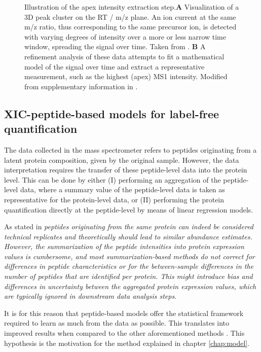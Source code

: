 \documentclass[11pt, a4paper]{report}
\begin{document}
\begin{figure}[!h]
\begin{subfigure}{1\textwidth}
\end{subfigure}
\caption{Illustration of the apex intensity extraction step.\textbf{A} Visualization of a 3D peak cluster on the RT / m/z plane. An ion current at the same m/z ratio, thus corresponding to the same precursor ion, is detected with varying degrees of intensity over a more or less narrow time window, spreading the signal over time. Taken from \cite{Smith2014}. \textbf{B} A refinement analysis of these data attempts to fit a mathematical model of the signal over time and extract a representative measurement, such as the highest (apex) \ac{MS1} intensity. Modified from supplementary information in \cite{Argentini2016}.}
\label{figure:moff_apex}
\end{figure}


\subsection{\ac{XIC}-peptide-based models for label-free quantification}
\label{subsec:peptide_model}

The data collected in the mass spectrometer refers to peptides originating from a latent protein composition, given by the original sample. However, the data interpretation requires the transfer of these peptide-level data into the protein level. This can be done by either (I) performing an aggregation of the peptide-level data, where a summary value of the peptide-level data is taken as representative for the protein-level data, or (II) performing the protein quantification directly at the peptide-level by means of linear regression models.

As stated in \cite{Goeminne2015} \textit{peptides originating from the same protein can indeed be considered technical replicates and theoretically should lead to similar abundance estimates. However, the summarization of the peptide intensities into protein expression values is cumbersome, and most summarization-based methods do not correct for differences in peptide characteristics or for the between-sample differences in the number of peptides that are identified per protein. This might introduce bias and differences in uncertainty between the aggregated protein expression values, which are typically ignored in downstream data analysis steps}.

It is for this reason that peptide-based models offer the statistical framework required to learn as much from the data as possible. This translates into improved results when compared to the other aforementioned methods \cite{Goeminne2015}. This hypothesis is the motivation for the method explained in chapter \ref{chap:model}.
\end{document}
